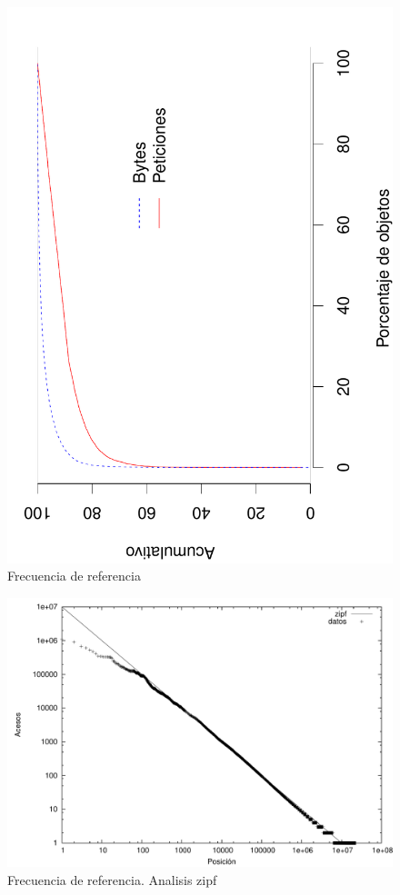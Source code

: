 \documentclass[twocolumn]{Jornadas}
\begin{document}
\begin{figure}[ht!]
\centering
\includegraphics[scale=0.30]{figures/ObjectPopularityCum_full.pdf}
\caption{Frecuencia de referencia}
\label{fig:ObjectPopu}
\end{figure}
\begin{figure}[t]
\centering
\includegraphics[scale=0.30]{figures/zipf.pdf} 
\caption{Frecuencia de referencia. Analisis zipf}
\label{fig:zipf}
\end{figure}
\end{document}
